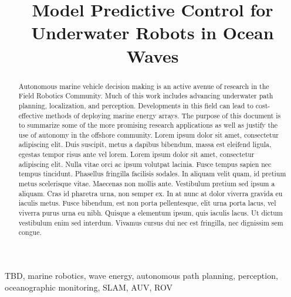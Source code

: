 \documentclass[letterpaper, 10pt, conference]{IEEEtran}
\begin{document}

\title{Model Predictive Control for\\Underwater Robots in Ocean Waves}

\author{
}

\maketitle
\thispagestyle{empty}
\pagestyle{empty}

\begin{abstract}
Autonomous marine vehicle decision making is an active avenue of research in the Field Robotics Community. Much of this work includes advancing underwater path planning, localization, and perception. Developments in this field can lead to cost-effective methods of deploying marine energy arrays. The purpose of this document is to summarize some of the more promising research applications as well as justify the use of autonomy in the offshore community. Lorem ipsum dolor sit amet, consectetur adipiscing elit. Duis suscipit, metus a dapibus bibendum, massa est eleifend ligula, egestas tempor risus ante vel lorem. Lorem ipsum dolor sit amet, consectetur adipiscing elit. Nulla vitae orci ac ipsum volutpat lacinia. Fusce tempus sapien nec tempus tincidunt. Phasellus fringilla facilisis sodales. In aliquam velit quam, id pretium metus scelerisque vitae. Maecenas non mollis ante. Vestibulum pretium sed ipsum a aliquam. Cras id pharetra urna, non semper ex. In at nunc at dolor viverra gravida eu iaculis metus. Fusce bibendum, est non porta pellentesque, elit urna porta lacus, vel viverra purus urna eu nibh. Quisque a elementum ipsum, quis iaculis lacus. Ut dictum vestibulum enim sed interdum. Vivamus cursus dui nec est fringilla, nec dignissim sem congue.
\end{abstract}

\begin{IEEEkeywords}	
TBD, marine robotics, wave energy, autonomous path planning, perception, oceanographic monitoring, SLAM, AUV, ROV
\end{IEEEkeywords}
\end{document}
